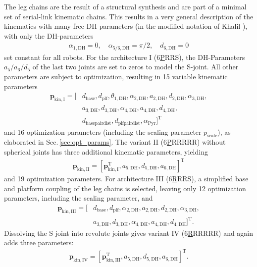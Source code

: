 \documentclass[fleqn,a4paper,10pt]{article}
\newcommand{\bm}[1]{\mathbf{#1}}
\newcommand{\transp}[0]{{\mathrm{T}}}
\begin{document}
\begin{multicols}{2}
The leg chains are the result of a structural synthesis \cite{Ramirez2018} and are part of a minimal set of serial-link kinematic chains.
This results in a very general description of the kinematics with many free DH-parameters (in the modified notation of Khalil \cite{KhalilDom2002}), with only the DH-parameters
%
\begin{align}
\alpha_{1,\mathrm{DH}}=0, \quad \alpha_{5/6,\mathrm{DH}}=\pi/2, \quad  d_{6,\mathrm{DH}}=0
\end{align}
%
set constant for all robots.
For the architecture I (6\underline{P}RRS), the DH-Parameters $a_5$/$a_6$/$d_5$ of the last two joints are set to zeros to model the S-joint.
%
All other parameters are subject to optimization, resulting in 15 variable kinematic parameters
%
\begin{align}
\bm{p}_\mathrm{kin,I}=[&d_\mathrm{base}, d_\mathrm{plf}, \theta_{1,\mathrm{DH}}, \alpha_{2,\mathrm{DH}}, a_{2,\mathrm{DH}}, d_{2,\mathrm{DH}}, \alpha_{3,\mathrm{DH}}, \nonumber \\
&a_{3,\mathrm{DH}}, d_{3,\mathrm{DH}}, \alpha_{4,\mathrm{DH}},a_{4,\mathrm{DH}}, d_{4,\mathrm{DH}},\nonumber \\
&d_\mathrm{basepairdist}, d_\mathrm{plfpairdist}, \alpha_\mathrm{Pyr} ]^\transp %
\end{align}
%
and 16 optimization parameters (including the scaling parameter $p_\mathrm{scale}$), as elaborated in Sec.\,\ref{sec:opt_params}.
The variant II (6\underline{P}RRRRR) without spherical joints has three additional kinematic parameters, yielding
%
%
\begin{align}
\bm{p}_\mathrm{kin,II}=[\bm{p}_\mathrm{kin,I}^\transp,a_{5,\mathrm{DH}},d_{5,\mathrm{DH}},a_{6,\mathrm{DH}}]^\transp
\end{align}
and
19 optimization parameters.
%
For architecture III (6\underline{R}RRS), a simplified base and platform coupling of the leg chains is selected, leaving only 12 optimization parameters, including the scaling parameter, and
%
%
\begin{align}
\bm{p}_\mathrm{kin,III}=[&d_\mathrm{base}, d_\mathrm{plf}, \alpha_{2,\mathrm{DH}}, a_{2,\mathrm{DH}}, d_{2,\mathrm{DH}}, \alpha_{3,\mathrm{DH}}, \nonumber \\
&a_{3,\mathrm{DH}}, d_{3,\mathrm{DH}}, \alpha_{4,\mathrm{DH}},a_{4,\mathrm{DH}}, d_{4,\mathrm{DH}}]^\transp. %
\end{align}
Dissolving the S joint into revolute joints gives variant IV (6\underline{R}RRRRR) and again adds three parameters:
%
%
\begin{align}
\bm{p}_\mathrm{kin,IV}=[\bm{p}_\mathrm{kin,III}^\transp,a_{5,\mathrm{DH}},d_{5,\mathrm{DH}},a_{6,\mathrm{DH}}]^\transp.
\end{align}


\end{multicols}
\end{document}
